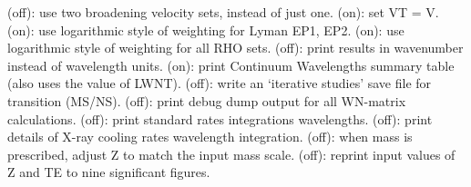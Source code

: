 \space \vbox { (off): \bang
use two broadening velocity sets, instead of just one.}
\space \vbox { (on): \bang
set VT = V.}
\space \vbox { (on): \bang
use logarithmic style of weighting for Lyman EP1, EP2.}
\space \vbox { (on): \bang
use logarithmic style of weighting for all RHO sets.}
\space \vbox { (off): \bang
print results in wavenumber instead of wavelength units.}
\space \vbox { (on): \bang
print Continuum Wavelengths summary table (also uses the value
of LWNT).}
\space \vbox { (off): \bang
write an `iterative studies' save file for transition (MS/NS).}
\space \vbox { (off): \bang
print debug dump output for all WN-matrix calculations.}
\space \vbox { (off): \bang
print standard rates integrations wavelengths.}
\space \vbox { (off): \bang
print details of X-ray cooling rates wavelength integration.}
\space \vbox { (off): \bang
when mass is prescribed, adjust Z to match the input mass scale.}
\space \vbox { (off): \bang
reprint input values of Z and TE to nine significant figures.}
\par\vfill
\ej
